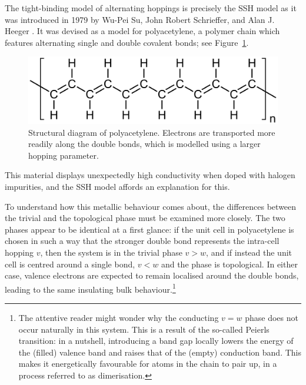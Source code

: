 The tight-binding model of alternating hoppings is precisely the SSH model as it was introduced in 1979 by Wu-Pei Su, John Robert Schrieffer, and Alan J. Heeger \cite{SSH_model,SSH_model2}. It was devised as a model for polyacetylene, a polymer chain which features alternating single and double covalent bonds; see Figure~\ref{fig:polyacetylene}.
\begin{figure}[htb!]
	\centering
	\includegraphics[width=.8\linewidth]{Images/polyacetylene}
	\caption{Structural diagram of polyacetylene. Electrons are transported more readily along the double bonds, which is modelled using a larger hopping parameter.}
	\label{fig:polyacetylene}
\end{figure}
This material displays unexpectedly high conductivity when doped with halogen impurities, and the SSH model affords an explanation for this.

To understand how this metallic behaviour comes about, the differences between the trivial and the topological phase must be examined more closely. The two phases appear to be identical at a first glance: if the unit cell in polyacetylene is chosen in such a way that the stronger double bond represents the intra-cell hopping $v$, then the system is in the trivial phase $v>w$, and if instead the unit cell is centred around a single bond, $v<w$ and the phase is topological. In either case, valence electrons are expected to remain localised around the double bonds, leading to the same insulating bulk behaviour.\footnote{
	The attentive reader might wonder why the conducting $v=w$ phase does not occur naturally in this system. This is a result of the so-called Peierls transition: in a nutshell, introducing a band gap locally lowers the energy of the (filled) valence band and raises that of the (empty) conduction band. This makes it energetically favourable for atoms in the chain to pair up, in a process referred to as dimerisation.}


